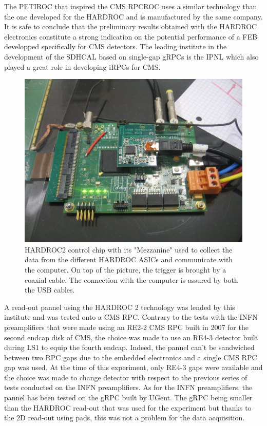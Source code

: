 	The PETIROC that inspired the CMS RPCROC uses a similar technology than the one developed for the HARDROC and is manufactured by the same company. It is safe to conclude that the preliminary results obtained with the HARDROC electronics constitute a strong indication on the potential performance of a FEB developped specifically for CMS detectors. The leading institute in the development of the SDHCAL based on single-gap \acf{gRPCs} is the \acf{IPNL} which also played a great role in developing iRPCs for CMS.
	
\begingroup\setlength{\intextsep}{5pt}\setlength{\columnsep}{15pt}

	\begin{figure}
	    \centering
		\includegraphics[width = \linewidth]{fig/chapt6/HARDROC_chip.JPG}
		\caption{\label{fig:HARDROC2-chip} HARDROC2 control chip with its "Mezzanine" used to collect the data from the different HARDROC ASICs and communicate with the computer. On top of the picture, the trigger is brought by a coaxial cable. The connection with the computer is assured by both the USB cables.}
    \end{figure}
	
	A read-out pannel using the HARDROC 2 technology was lended by this institute and was tested onto a CMS RPC. Contrary to the tests with the INFN preamplifiers that were made using an RE2-2 CMS RPC built in 2007 for the second endcap disk of CMS, the choice was made to use an RE4-3 detector built during LS1 to equip the fourth endcap. Indeed, the pannel can't be sandwiched between two RPC gaps due to the embedded electronics and a single CMS RPC gap was used. At the time of this experiment, only RE4-3 gaps were available and the choice was made to change detector with respect to the previous series of tests conducted on the INFN preamplifiers. As for the INFN preamplifiers, the pannel has been tested on the gRPC built by UGent. The gRPC being smaller than the HARDROC read-out that was used for the experiment but thanks to the 2D read-out using pads, this was not a problem for the data acquisition.
	
